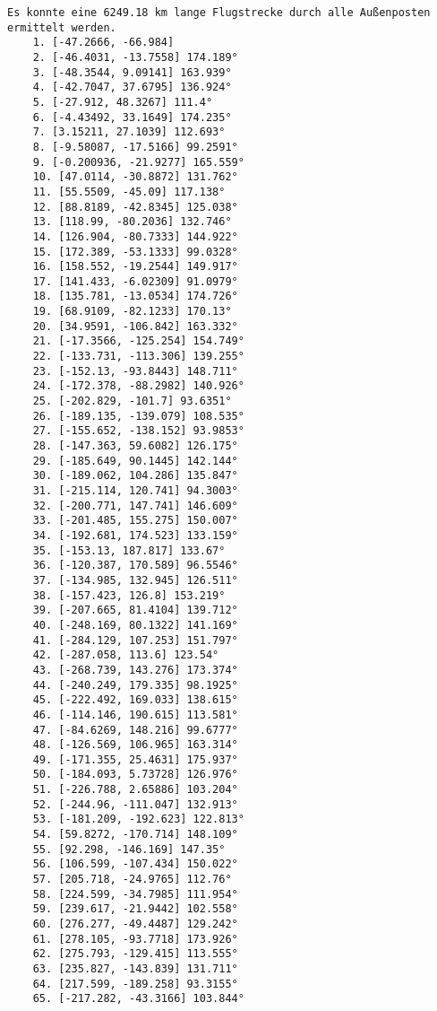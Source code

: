 \documentclass[a4paper,10pt,ngerman]{scrartcl}
\begin{document}
    \begin{lstlisting}[frame=single, title=Programmausgabe wenigerkrumm7.txt, breaklines=true,label={lst:lstlisting4}]
    Es konnte eine 6249.18 km lange Flugstrecke durch alle Außenposten ermittelt werden.
    1. [-47.2666, -66.984]
    2. [-46.4031, -13.7558] 174.189°
    3. [-48.3544, 9.09141] 163.939°
    4. [-42.7047, 37.6795] 136.924°
    5. [-27.912, 48.3267] 111.4°
    6. [-4.43492, 33.1649] 174.235°
    7. [3.15211, 27.1039] 112.693°
    8. [-9.58087, -17.5166] 99.2591°
    9. [-0.200936, -21.9277] 165.559°
    10. [47.0114, -30.8872] 131.762°
    11. [55.5509, -45.09] 117.138°
    12. [88.8189, -42.8345] 125.038°
    13. [118.99, -80.2036] 132.746°
    14. [126.904, -80.7333] 144.922°
    15. [172.389, -53.1333] 99.0328°
    16. [158.552, -19.2544] 149.917°
    17. [141.433, -6.02309] 91.0979°
    18. [135.781, -13.0534] 174.726°
    19. [68.9109, -82.1233] 170.13°
    20. [34.9591, -106.842] 163.332°
    21. [-17.3566, -125.254] 154.749°
    22. [-133.731, -113.306] 139.255°
    23. [-152.13, -93.8443] 148.711°
    24. [-172.378, -88.2982] 140.926°
    25. [-202.829, -101.7] 93.6351°
    26. [-189.135, -139.079] 108.535°
    27. [-155.652, -138.152] 93.9853°
    28. [-147.363, 59.6082] 126.175°
    29. [-185.649, 90.1445] 142.144°
    30. [-189.062, 104.286] 135.847°
    31. [-215.114, 120.741] 94.3003°
    32. [-200.771, 147.741] 146.609°
    33. [-201.485, 155.275] 150.007°
    34. [-192.681, 174.523] 133.159°
    35. [-153.13, 187.817] 133.67°
    36. [-120.387, 170.589] 96.5546°
    37. [-134.985, 132.945] 126.511°
    38. [-157.423, 126.8] 153.219°
    39. [-207.665, 81.4104] 139.712°
    40. [-248.169, 80.1322] 141.169°
    41. [-284.129, 107.253] 151.797°
    42. [-287.058, 113.6] 123.54°
    43. [-268.739, 143.276] 173.374°
    44. [-240.249, 179.335] 98.1925°
    45. [-222.492, 169.033] 138.615°
    46. [-114.146, 190.615] 113.581°
    47. [-84.6269, 148.216] 99.6777°
    48. [-126.569, 106.965] 163.314°
    49. [-171.355, 25.4631] 175.937°
    50. [-184.093, 5.73728] 126.976°
    51. [-226.788, 2.65886] 103.204°
    52. [-244.96, -111.047] 132.913°
    53. [-181.209, -192.623] 122.813°
    54. [59.8272, -170.714] 148.109°
    55. [92.298, -146.169] 147.35°
    56. [106.599, -107.434] 150.022°
    57. [205.718, -24.9765] 112.76°
    58. [224.599, -34.7985] 111.954°
    59. [239.617, -21.9442] 102.558°
    60. [276.277, -49.4487] 129.242°
    61. [278.105, -93.7718] 173.926°
    62. [275.793, -129.415] 113.555°
    63. [235.827, -143.839] 131.711°
    64. [217.599, -189.258] 93.3155°
    65. [-217.282, -43.3166] 103.844°

\end{lstlisting}
\end{document}
